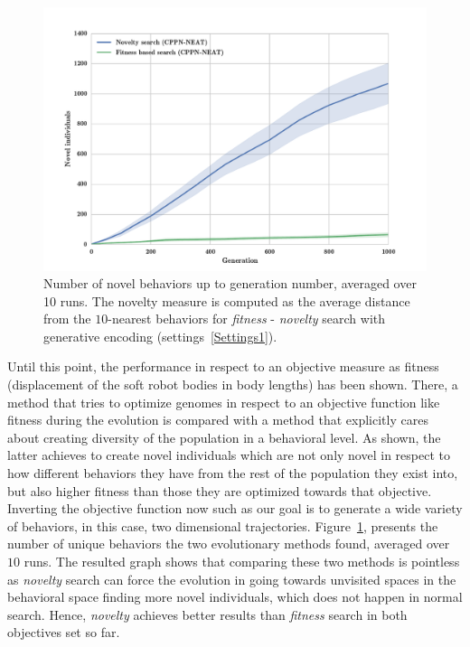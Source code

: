 \begin{figure}[ht!]
\centering
\includegraphics[width=1.0\textwidth]{../Figures/Results/novelIndividualsFitNovComp.pdf}
\caption{Number of novel behaviors up to generation number, averaged over 10 runs. The novelty measure is computed as the average distance from the $10$-nearest behaviors for \emph{fitness} - \emph{novelty} search with generative encoding (settings~\ref{Settings1}).}
\label{fig:novelIndividualsFitNovComp}
\end{figure}


Until this point, the performance in respect to an objective measure as fitness (displacement of the soft robot bodies in body lengths) has been shown. There, a method that tries to optimize genomes in respect to an objective function like fitness during the evolution is compared with a method that explicitly cares about creating diversity of the population in a behavioral level. As shown, the latter achieves to create novel individuals which are not only novel in respect to how different behaviors they have from the rest of the population they exist into, but also higher fitness than those they are optimized towards that objective. Inverting the objective function now such as our goal is to generate a wide variety of behaviors, in this case, two dimensional trajectories. Figure~\ref{fig:novelIndividualsFitNovComp}, presents the number of unique behaviors the two evolutionary methods found, averaged over $10$ runs. The resulted graph shows that comparing these two methods is pointless as \emph{novelty} search can force the evolution in going towards unvisited spaces in the behavioral space finding more novel individuals, which does not happen in normal search. Hence, \emph{novelty} achieves better results than \emph{fitness} search in both objectives set so far. 

